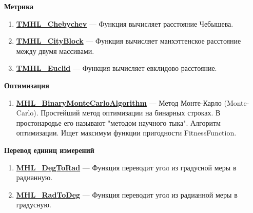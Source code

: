 \documentclass[a4paper,12pt]{article}
\begin{document}
\textbf{Метрика}
\begin{enumerate}

\item \textbf{\hyperref[TMHL_Chebychev]{TMHL\_Chebychev}} --- Функция вычисляет расстояние Чебышева.

\item \textbf{\hyperref[TMHL_CityBlock]{TMHL\_CityBlock}} --- Функция вычисляет манхэттенское расстояние между двумя массивами.

\item \textbf{\hyperref[TMHL_Euclid]{TMHL\_Euclid}} --- Функция вычисляет евклидово расстояние.

\end{enumerate}

\textbf{Оптимизация}
\begin{enumerate}

\item \textbf{\hyperref[MHL_BinaryMonteCarloAlgorithm]{MHL\_BinaryMonteCarloAlgorithm}} --- Метод Монте-Карло (Monte-Carlo). Простейший метод оптимизации на бинарных строках. В простонародье его называют "методом научного тыка". Алгоритм оптимизации. Ищет максимум функции пригодности FitnessFunction.

\end{enumerate}

\textbf{Перевод единиц измерений}
\begin{enumerate}

\item \textbf{\hyperref[MHL_DegToRad]{MHL\_DegToRad}} --- Функция переводит угол из градусной меры в радианную.

\item \textbf{\hyperref[MHL_RadToDeg]{MHL\_RadToDeg}} --- Функция переводит угол из радианной меры в градусную.

\end{enumerate}
\end{document}
